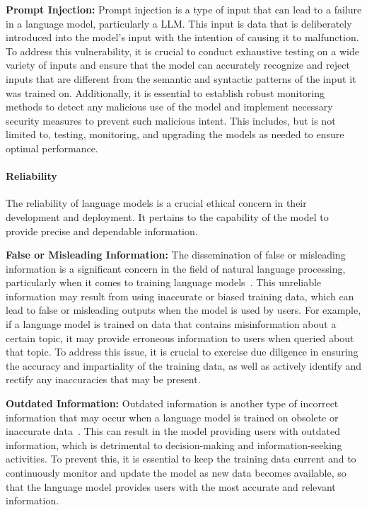 \textbf{Prompt Injection:} Prompt injection is a type of input that can lead to a failure in a language model, particularly a LLM. This input is data that is deliberately introduced into the model's input with the intention of causing it to malfunction. To address this vulnerability, it is crucial to conduct exhaustive testing on a wide variety of inputs and ensure that the model can accurately recognize and reject inputs that are different from the semantic and syntactic patterns of the input it was trained on. Additionally, it is essential to establish robust monitoring methods to detect any malicious use of the model and implement necessary security measures to prevent such malicious intent. This includes, but is not limited to, testing, monitoring, and upgrading the models as needed to ensure optimal performance.

\paragraph{Reliability}

The reliability of language models is a crucial ethical concern in their development and deployment. It pertains to the capability of the model to provide precise and dependable information.

\textbf{False or Misleading Information:} The dissemination of false or misleading information is a significant concern in the field of natural language processing, particularly when it comes to training language models~\cite{mcguffie2020radicalization}. This unreliable information may result from using inaccurate or biased training data, which can lead to false or misleading outputs when the model is used by users. For example, if a language model is trained on data that contains misinformation about a certain topic, it may provide erroneous information to users when queried about that topic. To address this issue, it is crucial to exercise due diligence in ensuring the accuracy and impartiality of the training data, as well as actively identify and rectify any inaccuracies that may be present.

\textbf{Outdated Information:} Outdated information is another type of incorrect information that may occur when a language model is trained on obsolete or inaccurate data~\cite{jang2021towards}. This can result in the model providing users with outdated information, which is detrimental to decision-making and information-seeking activities. To prevent this, it is essential to keep the training data current and to continuously monitor and update the model as new data becomes available, so that the language model provides users with the most accurate and relevant information.

